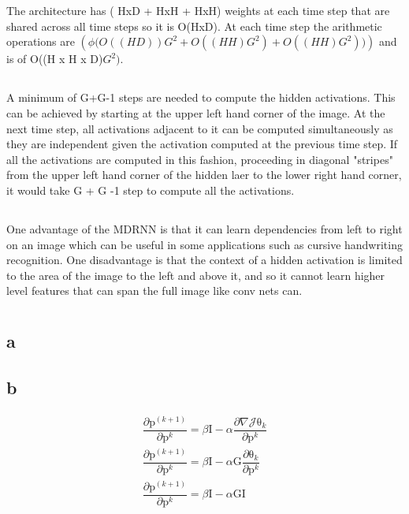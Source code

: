 \documentclass[12pt,letterpaper]{article} %
\newcommand{\bs}[1]{\bm{\mathrm{#1}}} %
\begin{document}
\section{}
\subsection{}
The architecture has ( HxD + HxH + HxH) weights at each time step that are shared across all time steps so it is O(HxD). At each time step the arithmetic operations are $(\phi\big ( O((HD))G^2 + O((HH)G^2) + O((HH)G^2) \big))$ and is of O((H x H x D)$G^2)$.
\subsection{}
A minimum of G+G-1 steps are needed to compute the hidden activations. This can be achieved by starting at the upper left hand corner of the image. At the next time step, all activations adjacent to it can be computed simultaneously as they are independent given the activation computed at the previous time step. If all the activations are computed in this fashion, proceeding in diagonal "stripes" from the upper left hand corner of the hidden laer to the lower right hand corner, it would take G + G -1 step to compute all the activations. 

\subsection{}
One advantage of the MDRNN is that it can learn dependencies from left to right on an image which can be useful in some applications such as cursive handwriting recognition. One disadvantage is that the context of a hidden activation is limited to the area of the image to the left and above it, and so it cannot learn higher level features that can span the full image like conv nets can. 

\section{}
\subsection{a}

\subsection{b}
\begin{align*}
\dfrac{\partial \bs{p}^{(k+1)}}{\partial \bs{p}^k} = \beta \bs{I} - \alpha \dfrac{\partial \nabla \mathcal{J}\bs{\theta}_k}{\partial \bs{p}^k}\\
\dfrac{\partial \bs{p}^{(k+1)}}{\partial \bs{p}^k} = \beta\bs{I} - \alpha \bs{G}\dfrac{\partial \bs{\theta}_k}{\partial \bs{p}^k}\\
\dfrac{\partial \bs{p}^{(k+1)}}{\partial \bs{p}^k} = \beta\bs{I} - \alpha \bs{G}\bs{I}
\end{align*}
\end{document}
